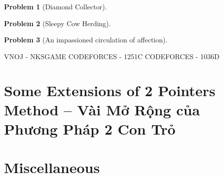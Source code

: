 \documentclass{article}
\newtheorem{problem}{Problem}
\begin{document}
\begin{problem}[Diamond Collector]

\end{problem}

\begin{problem}[Sleepy Cow Herding]

\end{problem}

\begin{problem}[An impassioned circulation of affection]

\end{problem}

VNOJ - NKSGAME
CODEFORCES - 1251C
CODEFORCES - 1036D


\section{Some Extensions of 2 Pointers Method -- Vài Mở Rộng của Phương Pháp 2 Con Trỏ}




\section{Miscellaneous}


\printbibliography[heading=bibintoc]
\end{document}
